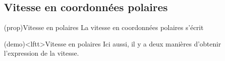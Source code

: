 \documentclass[../../main/main.tex]{subfiles}
\begin{document}
\subsection{Vitesse en coordonnées polaires}

\begin{tcb*}(prop){Vitesse en polaires}
	La vitesse en coordonnées polaires s'écrit
	\psw{\[\boxed{\vf(t) = \rp(t)\ur + r(t)\tp(t)\ut}\]}
	\vspace{-15pt}
\end{tcb*}

\begin{tcb}(demo)<lftt>{Vitesse en polaires}
	Ici aussi, il y a deux manières d'obtenir l'expression de la vitesse.
	\vspace{-15pt}
	\vspace{-15pt}
	\tcblower
	\psw{%
		\[
			\vf(t) =
			\dv{\OM}{t} =
			\frac{\dd{r}\ur + r(t) \dd{\th}\ut}{\dd{t}} =
			\dv{r}{t} \ur + r(t) \dv{\th}{t}\ut
			\qed
		\]
	}%
	\vspace{-15pt}
\end{tcb}
\end{document}
